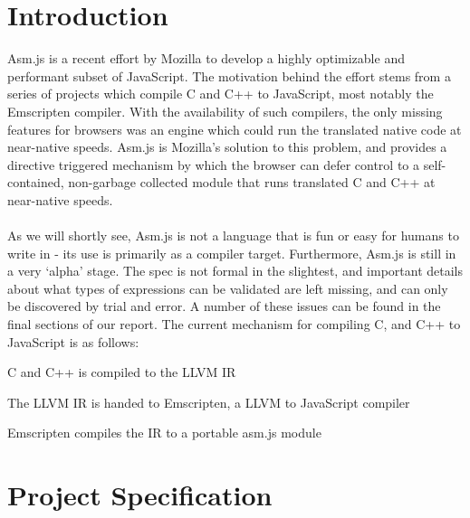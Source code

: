 \documentclass[twoside]{article}
\begin{document}
\begin{multicols}{2} %

\section{Introduction}


Asm.js is a recent effort by Mozilla to develop a highly optimizable and performant
subset of JavaScript. The motivation behind the effort stems from a series of projects which
compile C and C++ to JavaScript, most notably the Emscripten compiler. With the availability of such
compilers, the only missing features for browsers was an engine which could run the
translated native code at near-native speeds. Asm.js is Mozilla's solution to this problem,
and provides a directive triggered mechanism by which the browser can defer control to a
self-contained, non-garbage collected module that runs translated C and C++ at near-native speeds. \\
\\
As we will shortly see, Asm.js is not a language that is fun or easy for humans to write in -
its use is primarily as a compiler target. Furthermore, Asm.js is still in a very `alpha' stage. 
The spec is not formal in the slightest, and important details about what types of expressions can
be validated are left missing, and can only be discovered by trial and error. A number of these issues
can be found in the final sections of our report. The current mechanism for compiling C, and C++ to
JavaScript is as follows:

\begin{compactitem}
  \item C and C++ is compiled to the LLVM IR
  \item The LLVM IR is handed to Emscripten, a LLVM to JavaScript compiler
  \item Emscripten compiles the IR to a portable asm.js module
\end{compactitem}



\section{Project Specification}


\end{multicols}
\end{document}

